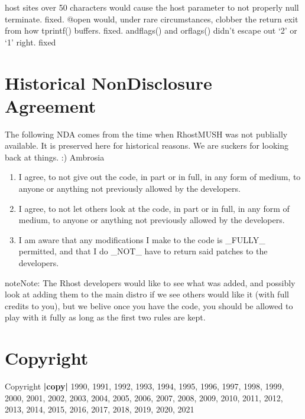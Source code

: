 \documentclass[letterpaper,10pt,english]{sphinxmanual}
\begin{document}
\sphinxAtStartPar
host sites over 50 characters would cause the host parameter to not properly null terminate.  \sphinxhyphen{} fixed.
@open would, under rare circumstances, clobber the return exit from how tprintf() buffers. \sphinxhyphen{}fixed.
andflags() and orflags() didn’t escape out ‘2’ or ‘1’ right. \sphinxhyphen{} fixed


\chapter{Historical Non\sphinxhyphen{}Disclosure Agreement}
\label{\detokenize{nda:historical-non-disclosure-agreement}}\label{\detokenize{nda::doc}}
\sphinxAtStartPar
The following NDA comes from the time when RhostMUSH was not publially
available. It is preserved here for historical reasons. We are suckers for
looking back at things. :)
\textendash{}Ambrosia
\begin{enumerate}
%
\item {} 
\sphinxAtStartPar
I agree, to not give out the code, in part or in full, in any form of
medium, to anyone or anything not previously allowed by the developers.

\item {} 
\sphinxAtStartPar
I agree, to not let others look at the code, in part or in full, in
any form of medium, to anyone or anything not previously allowed by the
developers.

\item {} 
\sphinxAtStartPar
I am aware that any modifications I make to the code is \_FULLY\_
permitted, and that I do \_NOT\_ have to return said patches to the
developers.

\end{enumerate}

\begin{sphinxadmonition}{note}{Note:}
\sphinxAtStartPar
The Rhost developers would like to see what was added, and possibly
look at adding them to the main distro if we see others would like
it (with full credits to you), but we belive once you have the code,
you should be allowed to play with it fully as long as the first two
rules are kept.
\end{sphinxadmonition}


\chapter{Copyright}
\label{\detokenize{index:copyright}}
\sphinxAtStartPar
Copyright {\color{red}\bfseries{}|copy|} 1990, 1991, 1992, 1993, 1994, 1995, 1996, 1997, 1998, 1999,
2000, 2001, 2002, 2003, 2004, 2005, 2006, 2007, 2008, 2009, 2010, 2011, 2012,
2013, 2014, 2015, 2016, 2017, 2018, 2019, 2020, 2021
\end{document}
